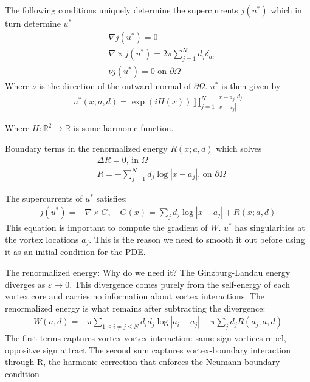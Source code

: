 \documentclass[12pt, a4paper]{article}
\theoremstyle{plain}
\theoremstyle{definition}
\newcommand{\R}{\mathbb{R}}
\begin{document}
The following conditions uniquely determine the supercurrents $j(u^*)$ which in turn determine $u^*$
\begin{align}
  &\nabla j(u^*) =0\\
  &\nabla \times j(u^*) = 2\pi \sum^N_{j=1} d_j \delta_{a_j} \\
  &\nu j(u^*) =0 \text{ on } \partial \Omega
\end{align}
Where $\nu$ is the direction of the outward normal of $\partial \Omega$. 
$u^*$ is then given by
\begin{align}
  u^* (x; a,d) = \exp (i H(x)) \prod^N_{j=1} \frac{x-a_j}{|x-a_j|}^{d_j}
\end{align}

Where $H:\R^2 \to \R$ is some harmonic function.

Boundary terms in the renormalized energy $R(x; a,d)$ which solves
\begin{align}
  &\Delta R = 0 \text{, in } \Omega \\
  &R = - \sum^N_{j=1} d_j \log |x-a_j| \text{, on } \partial \Omega
\end{align}

The supercurrents of $u^*$ satisfies:
\begin{align}
  j(u^*) = - \nabla \times G, \quad G(x) = \sum_j d_j \log |x-a_j| + R(x; a,d) 
\end{align}
This equation is important to compute the gradient of $W$. 
$u^*$ has singularities at the vortex locations $a_j$. This is the reason we need to smooth it out before using it as an initial condition for the PDE.

The renormalized energy:
Why do we need it?
The Ginzburg-Landau energy diverges as $\varepsilon \to 0$. This divergence comes purely from the self-energy of each vortex core and carries no information about vortex interactions.
The renormalized energy is what remains after subtracting the divergence:
\begin{align}
  W(a,d) =  - \pi \sum_{1 \leq i \neq j \leq N} d_i d_j \log |a_i - a_j| - \pi \sum_j d_j R(a_j ; a, d)
\end{align}
The first terms captures vortex-vortex interaction: same sign vortices repel, oppositve sign attract
The second sum captures vortex-boundary interaction through R, the harmonic correction that enforces the Neumann boundary condition
\end{document}

